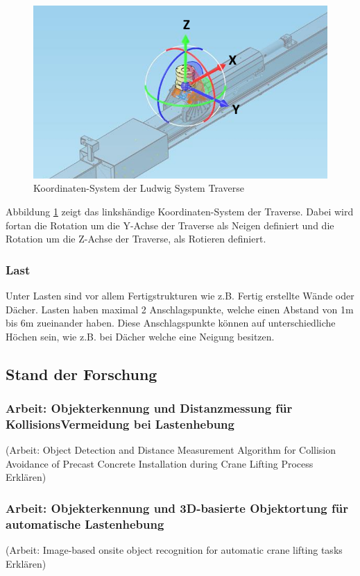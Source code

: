 \begin{figure}[h]
    \centering
    \includegraphics[width=0.5\linewidth]{graphics/Traverse_Rotationen.PNG}
    \caption{Koordinaten-System der Ludwig System Traverse}
    \label{fig:traverse}
\end{figure}

Abbildung \ref{fig:traverse} zeigt das linkshändige Koordinaten-System der Traverse. Dabei wird fortan die Rotation um die Y-Achse der Traverse als Neigen definiert und die Rotation um die Z-Achse der Traverse, als Rotieren definiert.

\subsubsection{Last}
Unter Lasten sind vor allem Fertigstrukturen wie z.B. Fertig erstellte Wände oder Dächer. Lasten haben maximal 2 Anschlagspunkte, welche einen Abstand von 1m bis 6m zueinander haben. Diese Anschlagspunkte können auf unterschiedliche Höchen sein, wie z.B. bei Dächer welche eine Neigung besitzen.

\subsection{Stand der Forschung}

\subsubsection{Arbeit: Objekterkennung und Distanzmessung für KollisionsVermeidung bei Lastenhebung}
(Arbeit: Object Detection and Distance Measurement Algorithm for Collision Avoidance of Precast Concrete Installation during Crane Lifting Process\cite{yong_object_2023} Erklären)

\subsubsection{Arbeit: Objekterkennung und 3D-basierte Objektortung für automatische Lastenhebung}
(Arbeit: Image-based onsite object recognition for automatic crane lifting tasks\cite{zhou_image-based_2021} Erklären)

